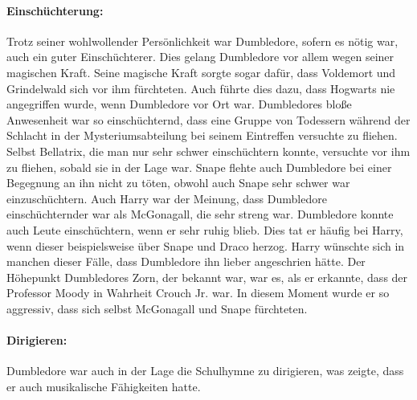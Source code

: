 \documentclass[a4paper, 10pt]{article}
\begin{document}
\paragraph{Einschüchterung:}
Trotz seiner wohlwollender Persönlichkeit war Dumbledore, sofern es nötig war, auch ein guter Einschüchterer. Dies gelang Dumbledore vor allem wegen seiner magischen Kraft. Seine magische Kraft sorgte sogar dafür, dass Voldemort und Grindelwald sich vor ihm fürchteten. Auch führte dies dazu, dass Hogwarts nie angegriffen wurde, wenn Dumbledore vor Ort war. Dumbledores bloße Anwesenheit war so einschüchternd, dass eine Gruppe von Todessern während der Schlacht in der Mysteriumsabteilung bei seinem Eintreffen versuchte zu fliehen. Selbst Bellatrix, die man nur sehr schwer einschüchtern konnte, versuchte vor ihm zu fliehen, sobald sie in der Lage war. Snape flehte auch Dumbledore bei einer Begegnung an ihn nicht zu töten, obwohl auch Snape sehr schwer war einzuschüchtern. Auch Harry war der Meinung, dass Dumbledore einschüchternder war als McGonagall, die sehr streng war. Dumbledore konnte auch Leute einschüchtern, wenn er sehr ruhig blieb. Dies tat er häufig bei Harry, wenn dieser beispielsweise über Snape und Draco herzog. Harry wünschte sich in manchen dieser Fälle, dass Dumbledore ihn lieber angeschrien hätte. Der Höhepunkt Dumbledores Zorn, der bekannt war, war es, als er erkannte, dass der Professor Moody in Wahrheit Crouch Jr. war. In diesem Moment wurde er so aggressiv, dass sich selbst McGonagall und Snape fürchteten.
\paragraph{Dirigieren:}
Dumbledore war auch in der Lage die Schulhymne zu dirigieren, was zeigte, dass er auch musikalische Fähigkeiten hatte.
\end{document}
